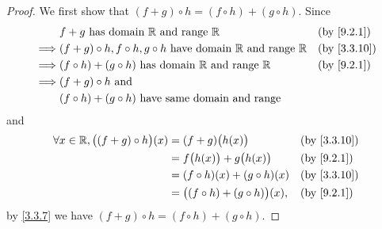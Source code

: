 \begin{proof}
  We first show that \((f + g) \circ h = (f \circ h) + (g \circ h)\).
  Since
  \begin{align*}
             & f + g \text{ has domain } \R \text{ and range } \R                                   &  & \by{9.2.1}  \\
    \implies & (f + g) \circ h, f \circ h, g \circ h  \text{ have domain } \R \text{ and range } \R &  & \by{3.3.10} \\
    \implies & (f \circ h) + (g \circ h)  \text{ has domain } \R \text{ and range } \R              &  & \by{9.2.1}  \\
    \implies & (f + g) \circ h \text{ and }                                                                          \\
             & (f \circ h) + (g \circ h) \text{ have same domain and range}
  \end{align*}
  and
  \begin{align*}
    \forall x \in \R, \big((f + g) \circ h\big)(x) & = (f + g)\big(h(x)\big)                   &  & \by{3.3.10} \\
                                                   & = f\big(h(x)\big) + g\big(h(x)\big)       &  & \by{9.2.1}  \\
                                                   & = (f \circ h)(x) + (g \circ h)(x)         &  & \by{3.3.10} \\
                                                   & = \big((f \circ h) + (g \circ h)\big)(x), &  & \by{9.2.1}
  \end{align*}
  by \cref{3.3.7} we have \((f + g) \circ h = (f \circ h) + (g \circ h)\).


\end{proof}
